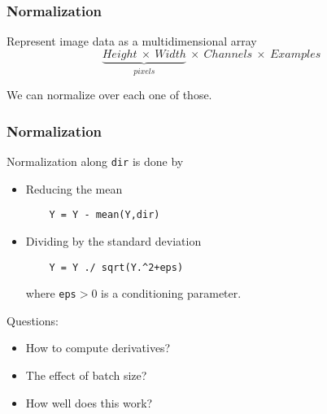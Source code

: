 \documentclass[12pt,fleqn,handout]{beamer}
\begin{document}
\begin{frame}[fragile]\frametitle{Normalization}

\begin{center}
\end{center}

Represent image data as a multidimensional  array
$$ \underbrace{Height\ \times\ Width}_{pixels}\ \times\ Channels\ \times\ Examples $$

We can normalize over each one of those.

\end{frame}

\begin{frame}[fragile]\frametitle{Normalization}

Normalization along \texttt{dir} is done by
\begin{itemize}
\item
Reducing the mean
\begin{verbatim}
	Y = Y - mean(Y,dir)
\end{verbatim}
\item 
Dividing by the standard deviation
\begin{verbatim}
	Y = Y ./ sqrt(Y.^2+eps)
\end{verbatim}
where \texttt{eps}$>0$ is a conditioning parameter.
\end{itemize}

\bigskip
\pause

Questions:
\begin{itemize}
\item How to compute derivatives?

\item The effect of batch size?

\item How well does this work?
\end{itemize}


\end{frame}
\end{document}
